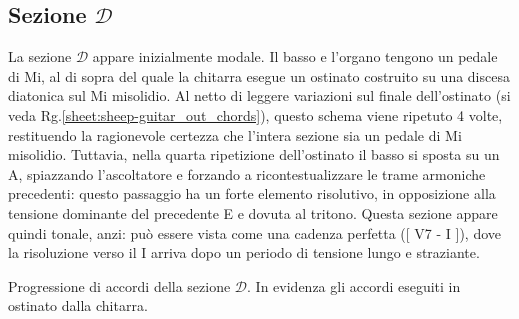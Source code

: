 \documentclass[class=book, crop=false, oneside, 12pt]{standalone}
\begin{document}
    \subsection*{Sezione \(\mathcal{D}\)}
    La sezione \(\mathcal{D}\) appare inizialmente modale. Il basso e l'organo tengono un pedale di Mi, al di sopra del quale la chitarra esegue un ostinato costruito su una discesa diatonica sul Mi misolidio. Al netto di leggere variazioni sul finale dell'ostinato (si veda Rg.\ref{sheet:sheep-guitar_out_chords}), questo schema viene ripetuto 4 volte, restituendo la ragionevole certezza che l'intera sezione sia un pedale di Mi misolidio. Tuttavia, nella quarta ripetizione dell'ostinato il basso si sposta su un A, spiazzando l'ascoltatore e forzando a ricontestualizzare le trame armoniche precedenti: questo passaggio ha un forte elemento risolutivo, in opposizione alla tensione dominante del precedente E e dovuta al tritono. Questa sezione appare quindi tonale, anzi: può essere vista come una cadenza perfetta ([ V7 - I ]), dove la risoluzione verso il I arriva dopo un periodo di tensione lungo e straziante.

    
    \begin{sheet}[htbp]
        \centering
        \caption{Progressione di accordi della sezione \(\mathcal{D}\). In evidenza gli accordi eseguiti in ostinato dalla chitarra.}
        \label{sheet:sheep-guitar_out_chords}
    \end{sheet}
    
\end{document}
